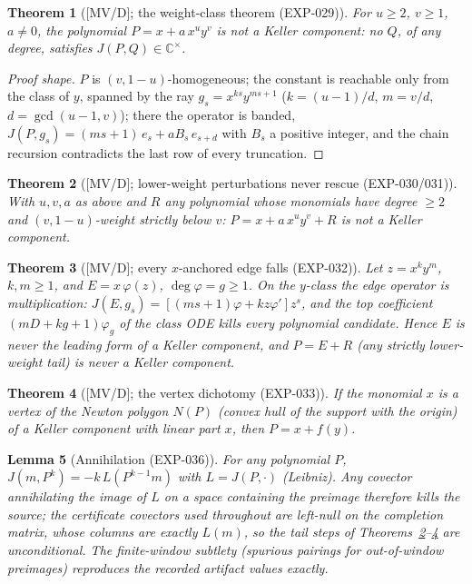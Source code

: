 \documentclass[11pt]{article}
\newtheorem{theorem}{Theorem}[section]
\newtheorem{lemma}[theorem]{Lemma}
\theoremstyle{remark}
\newcommand{\C}{\mathbb{C}}
\begin{document}
\begin{theorem}[{[MV/D]}; the weight-class theorem (EXP-029)]\label{thm:t1}
For $u \ge 2$, $v \ge 1$, $a \ne 0$, the polynomial $P = x + a\,x^u y^v$ is not a Keller
component: no $Q$, of any degree, satisfies $J(P, Q) \in \C^\times$.
\end{theorem}

\begin{proof}[Proof shape]
$P$ is $(v, 1-u)$-homogeneous; the constant is reachable only from the class of $y$, spanned
by the ray $g_s = x^{ks} y^{ms+1}$ ($k = (u-1)/d$, $m = v/d$, $d = \gcd(u-1, v)$); there the
operator is banded, $J(P, g_s) = (ms+1)\,e_s + a B_s\,e_{s+d}$ with $B_s$ a positive integer,
and the chain recursion contradicts the last row of every truncation.
\end{proof}

\begin{theorem}[{[MV/D]}; lower-weight perturbations never rescue (EXP-030/031)]\label{thm:t2}
With $u, v, a$ as above and $R$ any polynomial whose monomials have degree $\ge 2$ and
$(v, 1-u)$-weight strictly below $v$: $P = x + a\,x^u y^v + R$ is not a Keller component.
\end{theorem}

\begin{theorem}[{[MV/D]}; every $x$-anchored edge falls (EXP-032)]\label{thm:t3}
Let $z = x^k y^m$, $k, m \ge 1$, and $E = x\,\varphi(z)$, $\deg\varphi = g \ge 1$. On the
$y$-class the edge operator is \emph{multiplication}:
$J(E, g_s) = [(ms + 1)\varphi + k z \varphi'] z^s$, and the top coefficient
$(mD + kg + 1)\varphi_g$ of the class ODE kills every polynomial candidate. Hence $E$ is
never the leading form of a Keller component, and $P = E + R$ (any strictly lower-weight
tail) is never a Keller component.
\end{theorem}

\begin{theorem}[{[MV/D]}; the vertex dichotomy (EXP-033)]\label{thm:t4}
If the monomial $x$ is a vertex of the Newton polygon $N(P)$ (convex hull of the support
with the origin) of a Keller component with linear part $x$, then $P = x + f(y)$.
\end{theorem}

\begin{lemma}[Annihilation (EXP-036)]\label{lem:annihilation}
For any polynomial $P$, $J(m, P^k) = -k\,L(P^{k-1} m)$ with $L = J(P, \cdot)$ (Leibniz). Any
covector annihilating the image of $L$ on a space containing the preimage therefore kills the
source; the certificate covectors used throughout are left-null on the completion matrix,
whose columns are exactly $L(m)$, so the tail steps of
Theorems~\ref{thm:t2}--\ref{thm:t4} are unconditional. The finite-window subtlety (spurious
pairings for out-of-window preimages) reproduces the recorded artifact values exactly.
\end{lemma}
\end{document}
